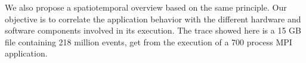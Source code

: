 \vfill
\begin{minipage}[c]{0.80\textwidth}
We also propose a spatiotemporal overview based on 
the same principle. Our objective is to correlate the application 
behavior with the different hardware and software components involved in its 
execution. The trace showed here is a 15 GB file containing 218 million 
events, get from the execution of a 700 process MPI application.
\end{minipage}
\vfill
\raggedright

